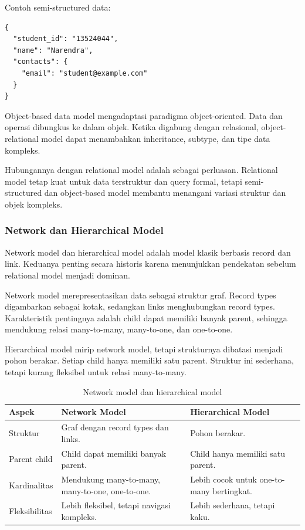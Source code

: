 Contoh semi-structured data:
\begin{lstlisting}[caption={Contoh data semi-terstruktur JSON}, label={lst:semi-structured-json}]
{
  "student_id": "13524044",
  "name": "Narendra",
  "contacts": {
    "email": "student@example.com"
  }
}
\end{lstlisting}

Object-based data model mengadaptasi paradigma object-oriented. Data dan operasi dibungkus ke dalam objek. Ketika digabung dengan relasional, object-relational model dapat menambahkan inheritance, subtype, dan tipe data kompleks.

Hubungannya dengan relational model adalah sebagai perluasan. Relational model tetap kuat untuk data terstruktur dan query formal, tetapi semi-structured dan object-based model membantu menangani variasi struktur dan objek kompleks.

\subsubsection{Network dan Hierarchical Model}

\begin{jawab}
Network model dan hierarchical model adalah model klasik berbasis record dan link. Keduanya penting secara historis karena menunjukkan pendekatan sebelum relational model menjadi dominan.
\end{jawab}

Network model merepresentasikan data sebagai struktur graf. Record types digambarkan sebagai kotak, sedangkan links menghubungkan record types. Karakteristik pentingnya adalah child dapat memiliki banyak parent, sehingga mendukung relasi many-to-many, many-to-one, dan one-to-one.

Hierarchical model mirip network model, tetapi strukturnya dibatasi menjadi pohon berakar. Setiap child hanya memiliki satu parent. Struktur ini sederhana, tetapi kurang fleksibel untuk relasi many-to-many.

\begin{table}[H]
\centering
\begin{tabularx}{\textwidth}{|L{0.22\textwidth}|X|X|}
\hline
\textbf{Aspek} & \textbf{Network Model} & \textbf{Hierarchical Model} \\
\hline
Struktur & Graf dengan record types dan links. & Pohon berakar. \\
\hline
Parent child & Child dapat memiliki banyak parent. & Child hanya memiliki satu parent. \\
\hline
Kardinalitas & Mendukung many-to-many, many-to-one, one-to-one. & Lebih cocok untuk one-to-many bertingkat. \\
\hline
Fleksibilitas & Lebih fleksibel, tetapi navigasi kompleks. & Lebih sederhana, tetapi kaku. \\
\hline
\end{tabularx}
\caption{Network model dan hierarchical model}
\label{tab:network-hierarchical}
\end{table}

